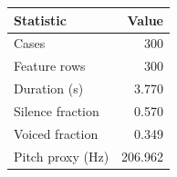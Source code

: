 \begin{tabular}{lr}
\toprule
Statistic & Value \\
\midrule
Cases & 300 \\
Feature rows & 300 \\
Duration (s) & 3.770 \\
Silence fraction & 0.570 \\
Voiced fraction & 0.349 \\
Pitch proxy (Hz) & 206.962 \\
\bottomrule
\end{tabular}
